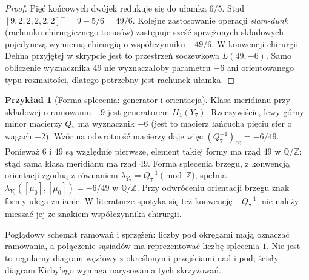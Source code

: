 \documentclass[11pt,a4paper]{report}
\numberwithin{equation}{section}
\theoremstyle{plain}
\theoremstyle{definition}
\newtheorem{przyklad}[twierdzenie]{Przykład}
\theoremstyle{remark}
\begin{document}
\begin{proof}
Pięć końcowych dwójek redukuje się do ułamka $6/5$.
Stąd $[9,2,2,2,2,2]^-=9-5/6=49/6$.
Kolejne zastosowanie operacji \emph{slam-dunk}
(rachunku chirurgicznego torusów) zastępuje sześć
sprzężonych składowych pojedynczą wymierną chirurgią
o współczynniku $-49/6$. W konwencji chirurgii Dehna
przyjętej w skrypcie jest to przestrzeń soczewkowa
$L(49,-6)$. Samo obliczenie wyznacznika $49$ nie
wyznaczałoby parametru $-6$ ani orientowanego typu
rozmaitości, dlatego potrzebny jest rachunek ułamka.
\end{proof}

\begin{przyklad}[Forma splecenia: generator i orientacja]
Klasa meridianu przy składowej o ramowaniu $-9$
jest generatorem $H_1(Y_7)$. Rzeczywiście, lewy górny
minor macierzy $Q_7$ ma wyznacznik $-6$ (jest to macierz
łańcucha pięciu sfer o wagach $-2$). Wzór na odwrotność
macierzy daje więc $(Q_7^{-1})_{00}=-6/49$.
Ponieważ $6$ i $49$ są względnie pierwsze, element
takiej formy ma rząd $49$ w $\mathbb Q/\mathbb Z$;
stąd sama klasa meridianu ma rząd $49$.
Forma splecenia brzegu, z konwencją orientacji zgodną
z równaniem $\lambda_{Y_7}=Q_7^{-1}\pmod{\mathbb Z}$,
spełnia $\lambda_{Y_7}([\mu_0],[\mu_0])=-6/49$
w $\mathbb Q/\mathbb Z$. Przy odwróceniu orientacji
brzegu znak formy ulega zmianie. W literaturze spotyka
się też konwencję $-Q_7^{-1}$; nie należy mieszać
jej ze znakiem współczynnika chirurgii.
\end{przyklad}

\begin{center}

{\footnotesize Poglądowy schemat ramowań i sprzężeń: liczby pod okręgami
mają oznaczać ramowania, a połączenie sąsiadów ma
reprezentować liczbę splecenia $1$. Nie jest to regularny
diagram węzłowy z określonymi przejściami nad i pod;
ścisły diagram Kirby'ego wymaga narysowania tych skrzyżowań.}
\end{center}
\end{document}

